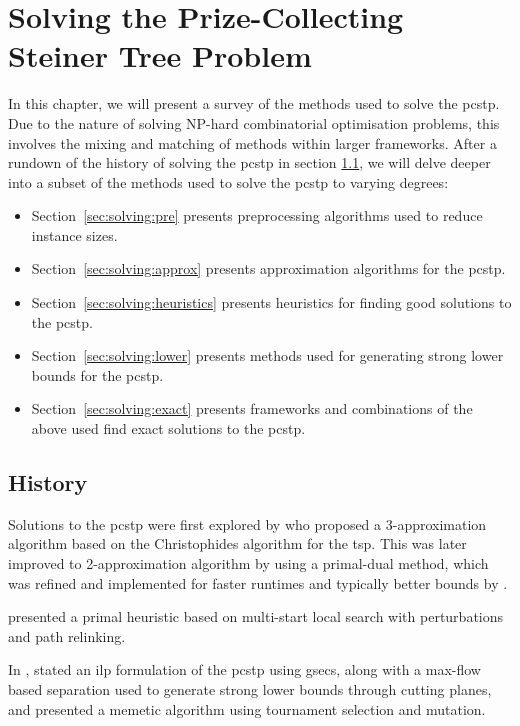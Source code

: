 \chapter{Solving the Prize-Collecting Steiner Tree Problem}
\label{chap:solving}

In this chapter, we will present a survey of the methods used to solve the \gls{pcstp}. Due to the nature of solving
NP-hard combinatorial optimisation problems, this involves the mixing and matching of methods within larger frameworks.
 After a rundown of the history of solving the \gls{pcstp} in section \ref{sec:solving:history}, we will delve deeper into a subset of the methods used to solve the \gls{pcstp} to varying degrees:
\begin{itemize}
\item Section~\ref{sec:solving:pre} presents preprocessing algorithms used to reduce instance sizes.
\item Section~\ref{sec:solving:approx} presents approximation algorithms for the \gls{pcstp}.
\item Section~\ref{sec:solving:heuristics} presents heuristics for finding good solutions to the \gls{pcstp}.
\item Section~\ref{sec:solving:lower} presents methods used for generating strong lower bounds for the \gls{pcstp}.
\item Section~\ref{sec:solving:exact} presents frameworks and combinations of the above used find exact solutions
   to the \gls{pcstp}.
\end{itemize}

\section{History}
\label{sec:solving:history}

Solutions to the \gls{pcstp} were first explored by \citet{Bienstock1993} who
proposed a 3-approximation algorithm based on the Christophides algorithm for the \gls{tsp}.
This was later improved to 2-approximation algorithm by
\citet{goemans1997primal} using a primal-dual method,
which was refined and implemented
for faster runtimes and typically better
bounds by \citet{Johnson:2000:PCS:338219.338637}.

\citet{canuto2001local} presented a primal heuristic based on multi-start
local search with perturbations and path relinking.

 In \citeyear{lucena2004strong}, \citet{lucena2004strong} stated an \gls{ilp} formulation of the \gls{pcstp} using \glspl{gsec},
along with a max-flow based separation used to generate strong lower bounds through cutting planes, and
\citet{Ljubic:2004:memetic}
 presented a memetic algorithm using tournament selection and mutation.

